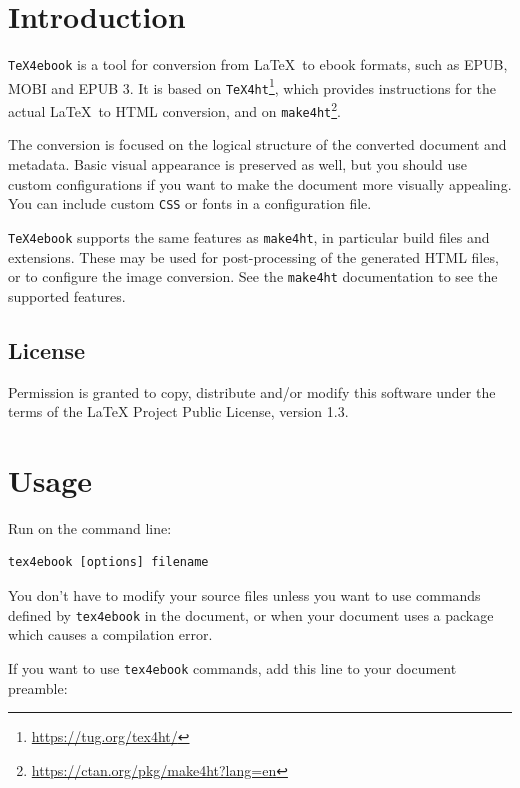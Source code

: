\hypertarget{introduction}{%
\section{Introduction}\label{introduction}}

\texttt{TeX4ebook} is a tool for conversion from \LaTeX~to ebook
formats, such as EPUB, MOBI and EPUB 3. It is based on
\texttt{TeX4ht}\footnote{\url{https://tug.org/tex4ht/}}, which provides
instructions for the actual \LaTeX~to HTML conversion, and on
\texttt{make4ht}\footnote{\url{https://ctan.org/pkg/make4ht?lang=en}}.

The conversion is focused on the logical structure of the converted
document and metadata. Basic visual appearance is preserved as well, but
you should use custom configurations if you want to make the document
more visually appealing. You can include custom \texttt{CSS} or fonts in
a configuration file.

\texttt{TeX4ebook} supports the same features as \texttt{make4ht}, in
particular build files and extensions. These may be used for
post-processing of the generated HTML files, or to configure the image
conversion. See the \texttt{make4ht} documentation to see the supported
features.

\hypertarget{license}{%
\subsection{License}\label{license}}

Permission is granted to copy, distribute and/or modify this software
under the terms of the LaTeX Project Public License, version 1.3.

\hypertarget{usage}{%
\section{Usage}\label{usage}}

Run on the command line:

\begin{verbatim}
tex4ebook [options] filename
\end{verbatim}

You don't have to modify your source files unless you want to use
commands defined by \texttt{tex4ebook} in the document, or when your
document uses a package which causes a compilation error.

If you want to use \texttt{tex4ebook} commands, add this line to your
document preamble:

